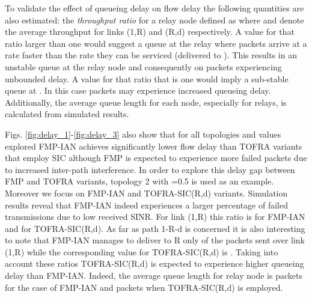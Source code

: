 \documentclass[conference]{IEEEtran}
\begin{document}
To validate the effect of queueing delay on flow delay the following quantities are also estimated: the \textit{throughput ratio}
for a relay node  defined as  where  and  denote the average
throughput for links (1,R) and (R,d) respectively. A value for that ratio larger than one would suggest a queue at the relay
where packets arrive at a rate faster than the rate they can be serviced (delivered to ). This results in an unstable queue at the relay node
and consequently on packets experiencing unbounded delay. A value for that ratio that is one would imply a sub-stable queue at . 
In this case packets may experience increased queueing delay.
Additionally, the average queue length for each node, especially for relays, is calculated from simulated results.

Figs. \ref{fig:delay_1}-\ref{fig:delay_3} also show that for all topologies and  values explored FMP-IAN
achieves significantly lower flow delay than TOFRA
variants that employ SIC although FMP is expected to experience more failed packets due to increased inter-path interference.
In order to explore this delay gap between FMP and TOFRA variants, topology 2 with =0.5 is used as an example.
Moreover we focus on FMP-IAN and TOFRA-SIC(R,d) variants. Simulation results reveal that FMP-IAN indeed experiences a larger
percentage of failed transmissions due to low received SINR. For link (1,R) this ratio is  for FMP-IAN and  for TOFRA-SIC(R,d).
As far as path 1-R-d is concerned it is also interesting to note that FMP-IAN manages to deliver to R only  of
the packets sent over link (1,R) while the corresponding value for TOFRA-SIC(R,d) is .
Taking into account these ratios TOFRA-SIC(R,d) is expected to experience higher queueing delay than FMP-IAN.
Indeed, the average queue length for relay node  is  packets for the case of FMP-IAN and  packets when TOFRA-SIC(R,d)
is employed.
\end{document}
